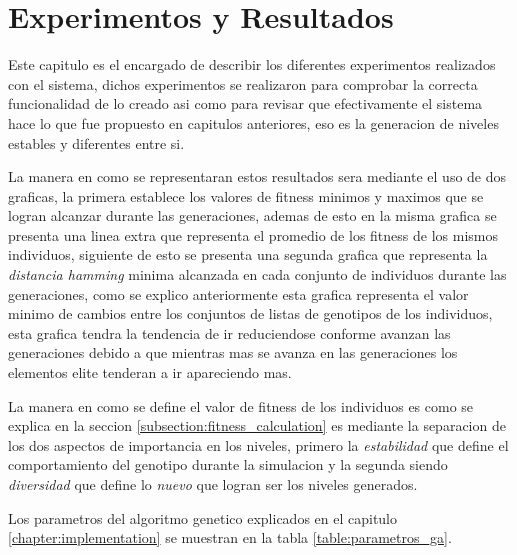 \chapter{Experimentos y Resultados}
\label{chapter:experiments-and-results}

Este capitulo es el encargado de describir los diferentes experimentos
realizados con el sistema, dichos experimentos se realizaron para comprobar la
correcta funcionalidad de lo creado asi como para revisar que efectivamente el
sistema hace lo que fue propuesto en capitulos anteriores, eso es la generacion
de niveles estables y diferentes entre si.

La manera en como se representaran estos resultados sera mediante el uso de dos
graficas, la primera establece los valores de fitness minimos y maximos que se
logran alcanzar durante las generaciones, ademas de esto en la misma grafica se
presenta una linea extra que representa el promedio de los fitness de los mismos
individuos, siguiente de esto se presenta una segunda grafica que representa la
\textit{distancia hamming} minima alcanzada en cada conjunto de individuos
durante las generaciones, como se explico anteriormente esta grafica representa
el valor minimo de cambios entre los conjuntos de listas de genotipos de los
individuos, esta grafica tendra la tendencia de ir reduciendose conforme avanzan
las generaciones debido a que mientras mas se avanza en las generaciones los
elementos elite tenderan a ir apareciendo mas.

La manera en como se define el valor de fitness de los individuos es como se
explica en la seccion \ref{subsection:fitness_calculation} es mediante la
separacion de los dos aspectos de importancia en los niveles, primero la
\textit{estabilidad} que define el comportamiento del genotipo durante la
simulacion y la segunda siendo \textit{diversidad} que define lo \textit{nuevo}
que logran ser los niveles generados.

Los parametros del algoritmo genetico explicados en el capitulo
\ref{chapter:implementation} se muestran en la tabla \ref{table:parametros_ga}.

